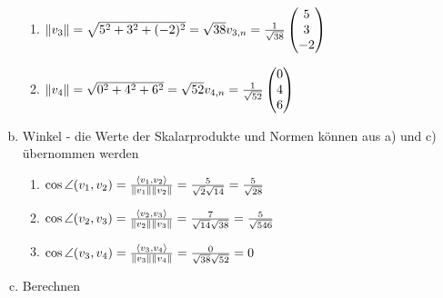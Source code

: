 \documentclass{standalone}
\begin{document}
\begin{enumerate}[a)]
\begin{enumerate}
        \item $\left\lVert v_3\right\rVert = \sqrt{5^2 + 3^2 + (-2)^2} = \sqrt{38} \\ v_{3,n} = \frac{1}{\sqrt{38}}\begin{pmatrix} 5 \\ 3 \\ -2 \end{pmatrix}$
        \item $\left\lVert v_4\right\rVert = \sqrt{0^2 + 4^2 + 6^2} = \sqrt{52} \\ v_{4,n} = \frac{1}{\sqrt{52}}\begin{pmatrix} 0 \\ 4 \\ 6 \end{pmatrix}$
    \end{enumerate}
    \item Winkel - die Werte der Skalarprodukte und Normen können aus a) und c) übernommen werden
    \begin{enumerate}
        \item $\cos \angle (v_1,v_2) = \frac{\langle v_1,v_2 \rangle}{\left\lVert v_1\right\rVert \left\lVert v_2\right\rVert} = 
        \frac{5}{\sqrt{2}\sqrt{14}} = \frac{5}{\sqrt{28}}$
        \item $\cos \angle (v_2,v_3) = \frac{\langle v_2,v_3 \rangle}{\left\lVert v_2\right\rVert \left\lVert v_3\right\rVert} = 
        \frac{7}{\sqrt{14}\sqrt{38}} = \frac{5}{\sqrt{546}}$
        \item $\cos \angle (v_3,v_4) = \frac{\langle v_3,v_4 \rangle}{\left\lVert v_3\right\rVert \left\lVert v_4\right\rVert} = 
        \frac{0}{\sqrt{38}\sqrt{52}} = 0$
    \end{enumerate}
    \item Berechnen
\end{enumerate}
\end{document}
